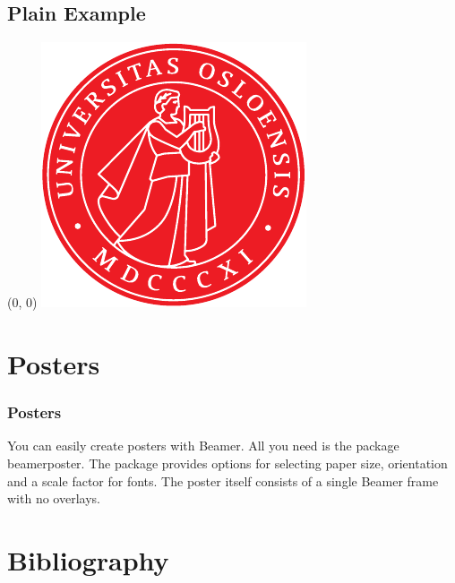 \documentclass[UKenglish, unknownkeysallowed]{beamer}
\begin{document}
\subsection{Plain Example}


\begin{frame}[plain]
    \begin{textblock}{1}(0, 0)
        \centering
        \includegraphics[height = \paperheight]{apollon}
    \end{textblock}
\end{frame}


\section{Posters}


\begin{frame}
    \frametitle{Posters}

    You can easily create posters with Beamer.
    All you need is the package \alert{beamerposter}.
    The package provides options for selecting paper size, orientation and a scale factor for fonts.
    The poster itself consists of a single Beamer frame with no overlays.
\end{frame}


\section{Bibliography}
\end{document}
